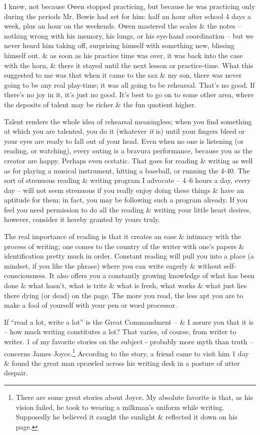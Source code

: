 \documentclass{article}
\numberwithin{equation}{section}
\begin{document}
I knew, not because Owen stopped practicing, but because he was practicing only during the periods Mr. Bowie had set for him: half an hour after school 4 days a week, plus an hour on the weekends. Owen mastered the scales \& the notes -- nothing wrong with his memory, his lungs, or his eye-hand coordination -- but we never heard him taking off, surprising himself with something new, blissing himself out. \& as soon as his practice time was over, it was back into the case with the horn, \& there it stayed until the next lesson or practice-time. What this suggested to me was that when it came to the sax \& my son, there was never going to be any real play-time; it was all going to be rehearsal. That's no good. If there's no joy in it, it's just no good. It's best to go on to some other area, where the deposits of talent may be richer \& the fun quotient higher.

Talent renders the whole idea of rehearsal meaningless; when you find something at which you are talented, you do it (whatever \textit{it} is) until your fingers bleed or your eyes are ready to fall out of your head. Even when no one is listening (or reading, or watching), every outing is a bravura performance, because you as the creator are happy. Perhaps even ecstatic. That goes for reading \& writing as well as for playing a musical instrument, hitting a baseball, or running the 4-40. The sort of strenuous reading \& writing program I advocate -- 4--6 hours a day, every day -- will not seem strenuous if you really enjoy doing these things \& have an aptitude for them; in fact, you may be following such a program already. If you feel you need permission to do all the reading \& writing your little heart desires, however, consider it hereby granted by yours truly.

The real importance of reading is that it creates an ease \& intimacy with the process of writing; one comes to the country of the writer with one's papers \& identification pretty much in order. Constant reading will pull you into a place (a mindset, if you like the phrase) where you can write eagerly \& without self-consciousness. It also offers you a constantly growing knowledge of what has been done \& what hasn't, what is trite \& what is fresh, what works \& what just lies there dying (or dead) on the page. The more you read, the less apt you are to make a fool of yourself with your pen or word processor.

 If ``read a lot, write a lot'' is the Great Commandment -- \& I assure you that it is -- how much writing constitutes a lot? That varies, of course, from writer to writer. 1 of my favorite stories on the subject - probably more myth than truth -- concerns James Joyce.\footnote{There are some great stories about Joyce. My absolute favorite is that, as his vision failed, he took to wearing a milkman's uniform while writing. Supposedly he believed it caught the sunlight \& reflected it down on his page.} According to the story, a friend came to visit him 1 day \& found the great man sprawled across his writing desk in a posture of utter despair.
\end{document}

